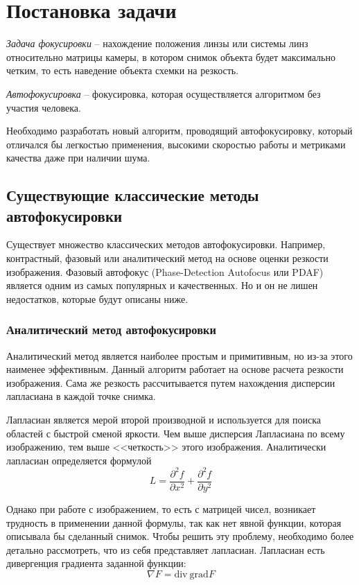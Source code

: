\chapter{Постановка задачи} \label{ch1}
\textit{Задача фокусировки} -- нахождение положения линзы или системы линз относительно матрицы камеры, в котором снимок объекта будет максимально четким, то есть наведение объекта схемки на резкость.

\textit{Автофокусировка} -- фокусировка, которая осуществляется алгоритмом без участия человека.

Необходимо разработать новый алгоритм, проводящий автофокусировку, который отличался бы легкостью применения, высокими скоростью работы и метриками качества даже при наличии шума.
\section{Существующие классические методы автофокусировки} \label{ch1:sec1}
Существует множество классических методов автофокусировки. Например, контрастный, фазовый или аналитический метод на основе оценки резкости изображения. Фазовый автофокус (Phase-Detection Autofocus или PDAF) является одним из самых популярных и качественных. Но и он не лишен недостатков, которые будут описаны ниже.

\subsection{Аналитический метод автофокусировки}
Аналитический метод является наиболее простым и примитивным, но из-за этого наименее эффективным. Данный алгоритм работает на основе расчета резкости изображения. Сама же резкость рассчитывается путем нахождения дисперсии лапласиана в каждой точке снимка. 

Лапласиан является мерой второй производной и используется для поиска областей с быстрой сменой яркости. Чем выше дисперсия Лапласиана по всему изображению, тем выше <<четкость>> этого изображения. Аналитически лапласиан определяется формулой
\begin{equation}
	L=\frac{\partial^2 f}{\partial x^2} + \frac{\partial^2 f}{\partial y^2}
\end{equation}

Однако при работе с изображением, то есть с матрицей чисел, возникает трудность в применении данной формулы, так как нет явной функции, которая описывала бы сделанный снимок. Чтобы решить эту проблему, необходимо более детально рассмотреть, что из себя представляет лапласиан. Лапласиан есть дивергенция градиента заданной функции:
\begin{equation}
	\nabla F = \text{div}\ \text{grad} F
\end{equation}

